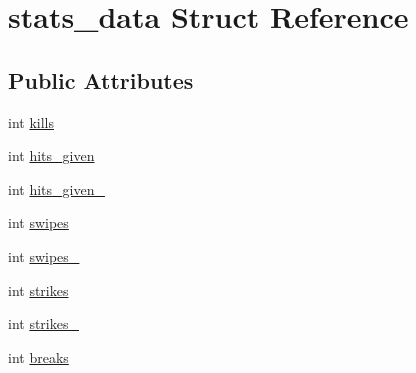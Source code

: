 \hypertarget{structstats__data}{\section{stats\-\_\-data Struct Reference}
\label{structstats__data}
}
\subsection*{Public Attributes}
\begin{DoxyCompactItemize}
\item 
int \hyperlink{structstats__data_ae7d08d0a27b0f33fb890d176d7695335}{kills}
\item 
int \hyperlink{structstats__data_a63149070bb61d1c3301b6036d7438eba}{hits\-\_\-given}
\item 
int \hyperlink{structstats__data_ac25231cdd786a1a31342a629cb3aa460}{hits\-\_\-given\-\_}
\item 
int \hyperlink{structstats__data_ad13f4120ba1a3d28801e61aad8a72c5b}{swipes}
\item 
int \hyperlink{structstats__data_a396ace92f63db8810d0b3a72752cfefe}{swipes\-\_}
\item 
int \hyperlink{structstats__data_a33514667c573932f9f532a05c9e465b7}{strikes}
\item 
int \hyperlink{structstats__data_adfafae05b4eb951648472534b2ae6415}{strikes\-\_}
\item 
int \hyperlink{structstats__data_a5d0d327b625586d49304613246db3c4e}{breaks}
\end{DoxyCompactItemize}


